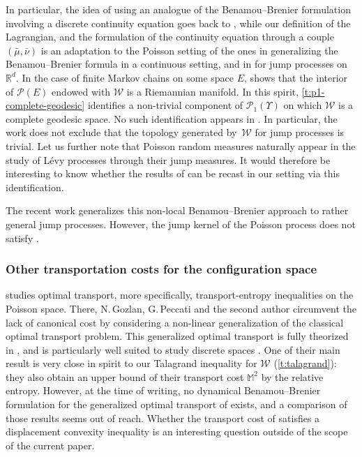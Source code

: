 \documentclass[JEP,XML,SOM,Unicode,published]{cedram}
\theoremstyle{definition}
\theoremstyle{remark}
\begin{document}
In particular, the idea of using an analogue of the Benamou--Brenier formulation involving a discrete continuity equation goes back to \cite{Maas}, while our definition of the Lagrangian, and the formulation of the continuity equation through a couple $(\bar{\mu}, \bar{\nu})$ is an adaptation to the Poisson setting of the ones in \cite{DNS09} generalizing the Benamou--Brenier formula in a continuous setting, and in \cite{Erbar} for jump processes on $\mathbb{R}^{d}$.
In the case of finite Markov chains on some space $E$, \cite{Maas} shows that the interior of $\mathscr{P}(E)$ endowed with $\mathcal{W}$ is a Riemannian manifold.
In this spirit, \cref{t:p1-complete-geodesic} identifies a non-trivial component of $\mathscr{P}_{1}(\varUpsilon)$ on which $\mathcal{W}$ is a complete geodesic space.
No such identification appears in \cite{Erbar}.
In particular, the work \cite{Erbar} does not exclude that the topology generated by~$\mathcal{W}$ for jump processes is trivial.
Let us further note that Poisson random measures naturally appear in the study of Lévy processes through their jump measures.
It would therefore be interesting to know whether the results of \cite{Erbar} can be recast in our setting via this identification.

The recent work \cite{PRST} generalizes this non-local Benamou--Brenier approach to rather general jump processes.
However, the jump kernel of the Poisson process does not satisfy \cite[Assumpt.\,(3.4)]{PRST}.

\subsubsection{Other transportation costs for the configuration space}
\cite{GHP} studies optimal transport, more specifically, transport-entropy inequalities on the Poisson space.
There, N.\,Gozlan, G.\,Peccati and the second author circumvent the lack of canonical cost by considering a non-linear generalization of the classical optimal transport problem.
This generalized optimal transport is fully theorized in \cite{GRST}, and is particularly well suited to study discrete spaces \cite{GRSTCurvature}.
One of their main result \cite[Th.\,1.2]{GHP} is very close in spirit to our Talagrand inequality for $\mathcal{W}$ (\cref{t:talagrand}): they also obtain an upper bound of their transport cost $\mathbb{M}^{2}$ by the relative entropy.
However, at the time of writing, no dynamical Benamou--Brenier formulation for the generalized optimal transport of \cite{GRST} exists, and a comparison of those results seems out of reach.
Whether the transport cost of \cite{GHP} satisfies a displacement convexity inequality is an interesting question outside of the scope of the current paper.
\end{document}
